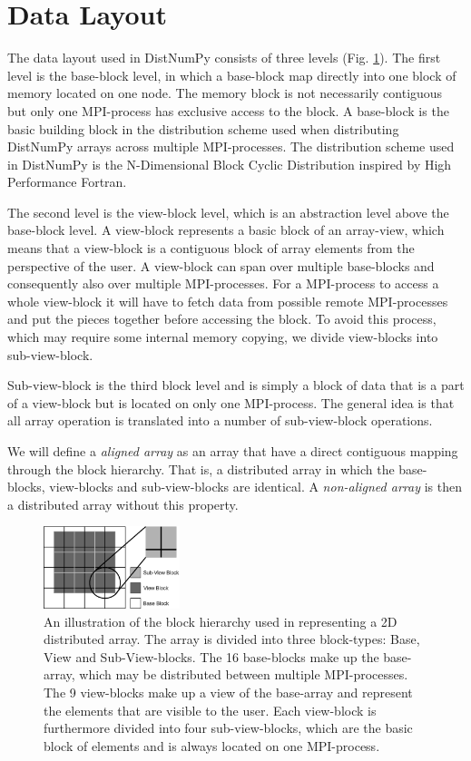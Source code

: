 \documentclass[preprint]{../PGAS10/sigplanconf}
\begin{document}
\section{Data Layout}
The data layout used in DistNumPy consists of three levels (Fig. \ref{fig:view_block}). The first level is the base-block level, in which a base-block map directly into one block of memory located on one node. The memory block is not necessarily contiguous but only one MPI-process has exclusive access to the block. A base-block is the basic building block in the distribution scheme used when distributing DistNumPy arrays across multiple MPI-processes. The distribution scheme used in DistNumPy is the N-Dimensional Block Cyclic Distribution\cite{distnumpy09} inspired by High Performance Fortran\cite{Loveman93}. 

The second level is the view-block level, which is an abstraction level above the base-block level. A view-block represents a basic block of an array-view, which means that a view-block is a contiguous block of array elements from the perspective of the user. A view-block can span over multiple base-blocks and consequently also over multiple MPI-processes. For a MPI-process to access a whole view-block it will have to fetch data from possible remote MPI-processes and put the pieces together before accessing the block. To avoid this process, which may require some internal memory copying, we divide view-blocks into sub-view-block.

Sub-view-block is the third block level and is simply a block of data that is a part of a view-block but is located on only one MPI-process. The general idea is that all array operation is translated into a number of sub-view-block operations.

We will define a \emph{aligned array} as an array that have a direct contiguous mapping through the block hierarchy. That is, a distributed array in which the base-blocks, view-blocks and sub-view-blocks are identical. A \emph{non-aligned array} is then a distributed array without this property.

\begin{figure}
 \centering
 \includegraphics[width=150px]{gfx/view_blocks}
 \caption{An illustration of the block hierarchy used in representing a 2D distributed array. The array is divided into three block-types: Base, View and Sub-View-blocks. The 16 base-blocks make up the base-array, which may be distributed between multiple MPI-processes. The 9 view-blocks make up a view of the base-array and represent the elements that are visible to the user. Each view-block is furthermore divided into four sub-view-blocks, which are the basic block of elements and is always located on one MPI-process.}
 \label{fig:view_block}
\end{figure}
\end{document}
